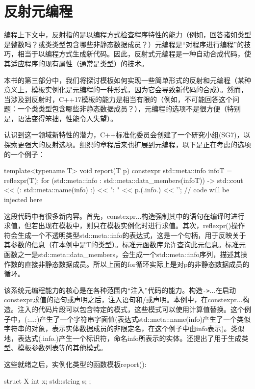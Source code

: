 \section{反射元编程}
编程上下文中，反射指的是以编程方式检查程序特性的能力（例如，回答诸如类型是整数吗？或类类型包含哪些非静态数据成员？）元编程是“对程序进行编程”的技巧，相当于以编程方式生成新代码。因此，反射式元编程是一种自动合成代码，使其适应程序的现有属性（通常是类型）的技术。

本书的第三部分中，我们将探讨模板如何实现一些简单形式的反射和元编程（某种意义上，模板实例化是元编程的一种形式，因为它会导致新代码的合成）。然而，当涉及到反射时，C++17模板的能力是相当有限的（例如，不可能回答这个问题：一个类类型包含哪些非静态数据成员？），元编程的选项不是很方便（特别是，语法变得笨拙，性能令人失望）。

认识到这一领域新特性的潜力，C++标准化委员会创建了一个研究小组(SG7)，以探索更强大的反射选项。组织的章程后来也扩展到元编程，以下是正在考虑的选项的一个例子：

\begin{cpp}
template<typename T> void report(T p) {
	constexpr {
		std::meta::info infoT = reflexpr(T);
		for (std::meta::info : std::meta::data_members(infoT)) {
			-> {
				std::cout << (: std::meta::name(info) :)
				<< ": " << p.(.info.) << '\n';
			}
		}
	}
	// code will be injected here
}
\end{cpp}

这段代码中有很多新内容。首先，constexpr{...}构造强制其中的语句在编译时进行求值，但若出现在模板中，则只在模板实例化时进行求值。其次，reflexpr()操作符会生成一个不透明类型std::meta::info的表达式，这是一个句柄，用于反映关于其参数的信息（在本例中是T的类型）。标准元函数库允许查询此元信息。标准元函数之一是std::meta::data\_members，会生成一个std::meta::info序列，描述其操作数的直接非静态数据成员。所以上面的for循环实际上是对p的非静态数据成员的循环。

该系统元编程能力的核心是在各种范围内“注入”代码的能力。构造\texttt{->}{...}在启动constexpr求值的语句或声明之后，注入语句和/或声明。本例中，在constexpr{...}构造。注入的代码片段可以包含特定的模式，这些模式可以使用计算值替换。这个例子中，(:...:)产生了一个字符串字面值(表达式std::meta::name(info)产生了一个类似字符串的对象，表示实体数据成员的非限定名，在这个例子中由info表示)。类似地，表达式(.info.)产生一个标识符，命名info所表示的实体。还提出了用于生成类型、模板参数列表等的其他模式。

这些就绪之后，实例化类型的函数模板report():

\begin{cpp}
struct X {
	int x;
	std::string s;
};
\end{cpp}

